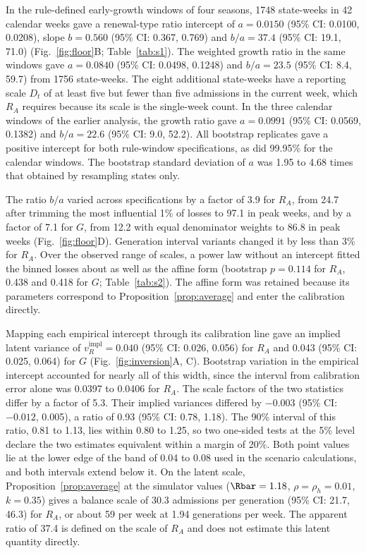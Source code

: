 In the rule-defined early-growth windows of four seasons, 1748 state-weeks in 42 calendar weeks gave a renewal-type ratio intercept of $a=0.0150$ (95\% CI: 0.0100, 0.0208), slope $b=0.560$ (95\% CI: 0.367, 0.769) and $b/a=37.4$ (95\% CI: 19.1, 71.0) (Fig.~\ref{fig:floor}B; Table~\ref{tab:s1}). The weighted growth ratio in the same windows gave $a=0.0840$ (95\% CI: 0.0498, 0.1248) and $b/a=23.5$ (95\% CI: 8.4, 59.7) from 1756 state-weeks. The eight additional state-weeks have a reporting scale $D_t$ of at least five but fewer than five admissions in the current week, which $R_A$ requires because its scale is the single-week count. In the three calendar windows of the earlier analysis, the growth ratio gave $a=0.0991$ (95\% CI: 0.0569, 0.1382) and $b/a=22.6$ (95\% CI: 9.0, 52.2). All bootstrap replicates gave a positive intercept for both rule-window specifications, as did 99.95\% for the calendar windows. The bootstrap standard deviation of $a$ was 1.95 to 4.68 times that obtained by resampling states only.

The ratio $b/a$ varied across specifications by a factor of 3.9 for $R_A$, from 24.7 after trimming the most influential 1\% of losses to 97.1 in peak weeks, and by a factor of 7.1 for $G$, from 12.2 with equal denominator weights to 86.8 in peak weeks (Fig.~\ref{fig:floor}D). Generation interval variants changed it by less than 3\% for $R_A$. Over the observed range of scales, a power law without an intercept fitted the binned losses about as well as the affine form (bootstrap $p=0.114$ for $R_A$, 0.438 and 0.418 for $G$; Table~\ref{tab:s2}). The affine form was retained because its parameters correspond to Proposition~\ref{prop:average} and enter the calibration directly.

Mapping each empirical intercept through its calibration line gave an implied latent variance of $v_R^{\mathrm{impl}}=0.040$ (95\% CI: 0.026, 0.056) for $R_A$ and 0.043 (95\% CI: 0.025, 0.064) for $G$ (Fig.~\ref{fig:inversion}A, C). Bootstrap variation in the empirical intercept accounted for nearly all of this width, since the interval from calibration error alone was 0.0397 to 0.0406 for $R_A$. The scale factors of the two statistics differ by a factor of 5.3. Their implied variances differed by $-0.003$ (95\% CI: $-0.012$, 0.005), a ratio of 0.93 (95\% CI: 0.78, 1.18). The 90\% interval of this ratio, 0.81 to 1.13, lies within 0.80 to 1.25, so two one-sided tests at the 5\% level declare the two estimates equivalent within a margin of 20\%. Both point values lie at the lower edge of the band of 0.04 to 0.08 used in the scenario calculations, and both intervals extend below it. On the latent scale, Proposition~\ref{prop:average} at the simulator values ($\Rbar=1.18$, $\rho=\rho_h=0.01$, $k=0.35$) gives a balance scale of 30.3 admissions per generation (95\% CI: 21.7, 46.3) for $R_A$, or about 59 per week at 1.94 generations per week. The apparent ratio of 37.4 is defined on the scale of $R_A$ and does not estimate this latent quantity directly.

